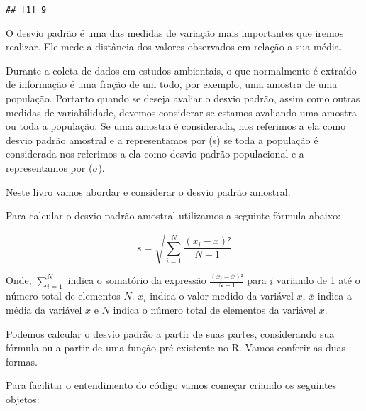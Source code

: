 \documentclass[14pt,titlepage, oneside, openany, a4paper]{book}
\newenvironment{Shaded}{\begin{snugshade}}{\end{snugshade}}
\newcommand{\KeywordTok}[1]{\textcolor[rgb]{0.13,0.29,0.53}{\textbf{#1}}}
\newcommand{\NormalTok}[1]{#1}
\newcommand{\OperatorTok}[1]{\textcolor[rgb]{0.81,0.36,0.00}{\textbf{#1}}}
\newcommand{\StringTok}[1]{\textcolor[rgb]{0.31,0.60,0.02}{#1}}
\begin{document}
\begin{Shaded}
\end{Shaded}

\begin{verbatim}
## [1] 9
\end{verbatim}

O desvio padrão é uma das medidas de variação mais importantes que iremos realizar. Ele mede a distância dos valores observados em relação a sua média.

Durante a coleta de dados em estudos ambientais, o que normalmente é extraído de informação é uma fração de um todo, por exemplo, uma amostra de uma população. Portanto quando se deseja avaliar o desvio padrão, assim como outras medidas de variabilidade, devemos considerar se estamos avaliando uma amostra ou toda a população. Se uma amostra é considerada, nos referimos a ela como desvio padrão amostral e a representamos por (s) se toda a população é considerada nos referimos a ela como desvio padrão populacional e a representamos por (\(\sigma\)).

Neste livro vamos abordar e considerar o desvio padrão amostral.

Para calcular o desvio padrão amostral utilizamos a seguinte fórmula abaixo:

\[s = \sqrt{\sum^{N}_{i = 1}\frac{(x_{i}-\overline{x})²}{N-1}}\]

Onde, \(\sum^{N}_{i=1}\) indica o somatório da expressão \(\frac{(x_{i}-\overline{x})²}{N-1}\) para \(i\) variando de 1 até o número total de elementos \(N\). \(x_{i}\) indica o valor medido da variável \(x\), \(\overline{x}\) indica a média da variável \(x\) e \(N\) indica o número total de elementos da variável \(x\).

Podemos calcular o desvio padrão a partir de suas partes, considerando sua fórmula ou a partir de uma função pré-existente no R. Vamos conferir as duas formas.

Para facilitar o entendimento do código vamos começar criando os seguintes objetos:

\begin{Shaded}
\end{Shaded}
\end{document}
